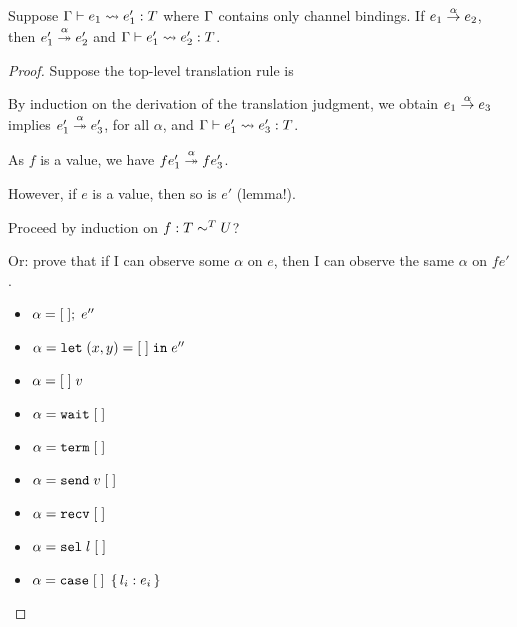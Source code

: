 \begin{lemma}
  Suppose $\Ctxt \vdash e_1 \leadsto e'_1 : T$ where $\Ctxt$ contains
  only channel bindings.  If
  $\reduce[\alpha]{e_1}{e_2}$, then $\reducemany[\alpha]{e'_1}{e'_2}$
  and $\Ctxt \vdash e'_1 \leadsto e'_2 : T$. 
\end{lemma}
\begin{proof}
  Suppose the top-level translation rule is
  \begin{mathpar}
  \end{mathpar}
  By induction on the derivation of the translation judgment, we
  obtain
  $\reduce[\alpha]{e_1}{e_3}$ implies $\reducemany[\alpha]{e_1'}{e'_3}$,
  for all $\alpha$, and $\Ctxt \vdash e_1' \leadsto e'_3 : T$.

  As $f$ is a value, we have $\reducemany[\alpha]{f e_1'}{f e'_3}$.


  However, if $e$ is a value, then so is $e'$ (lemma!). 

  Proceed by induction on $f : T \eqt U$?

  Or: prove that if I can observe some $\alpha$ on $e$, then I can
  observe the same $\alpha$ on $f e'$.

  \begin{itemize}
  \item $\alpha = \ELetU\EHole{e''}$
  \item $\alpha = \ELetP xy\EHole{e''}$
  \item $\alpha = \EHole\; v$
  \item $\alpha = \EWait\EHole$
  \item $\alpha = \ETerm\EHole$
  \item $\alpha = \ESend{v}\EHole$
  \item $\alpha = \ERecv\EHole$
  \item $\alpha = \ESelect l \EHole$
  \item $\alpha = \ECase\EHole{l_i: e_i}$
  \end{itemize}
  
\end{proof}


